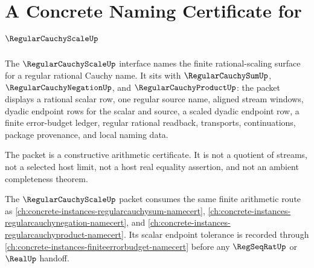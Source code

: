 \chapter{A Concrete Naming Certificate for $\RegularCauchyScaleUp$}
\label{ch:concrete-instances-regularcauchyscale-namecert}

The $\RegularCauchyScaleUp$ interface names the finite rational-scaling surface for a regular rational Cauchy name. It sits with $\RegularCauchySumUp$, $\RegularCauchyNegationUp$, and $\RegularCauchyProductUp$: the packet displays a rational scalar row, one regular source name, aligned stream windows, dyadic endpoint rows for the scalar and source, a scaled dyadic endpoint row, a finite error-budget ledger, regular rational readback, transports, continuations, package provenance, and local naming data.

The packet is a constructive arithmetic certificate. It is not a quotient of streams, not a selected host limit, not a host real equality assertion, and not an ambient completeness theorem.

The $\RegularCauchyScaleUp$ packet consumes the same finite arithmetic route as \autoref{ch:concrete-instances-regularcauchysum-namecert}, \autoref{ch:concrete-instances-regularcauchynegation-namecert}, and \autoref{ch:concrete-instances-regularcauchyproduct-namecert}. Its scalar endpoint tolerance is recorded through \autoref{ch:concrete-instances-finiteerrorbudget-namecert} before any $\RegSeqRatUp$ or $\RealUp$ handoff.

